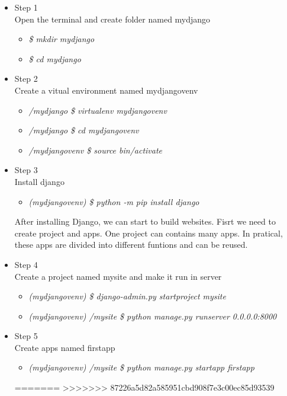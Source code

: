 \begin{itemize}
	  
		\item Step 1\\
		Open the terminal and create folder named mydjango
			\begin{itemize}
				\item\emph {\$ mkdir mydjango}\\
				\item\emph {\$ cd mydjango}
			\end{itemize}	
		\item Step 2\\
		Create a vitual environment named mydjangovenv
			\begin{itemize}
				\item\emph {/mydjango \$ virtualenv mydjangovenv}\\
				\item\emph {/mydjango \$ cd mydjangovenv}\\
				\item\emph {/mydjangovenv \$ source bin/activate}
			\end{itemize}	
		\item Step 3\\
		Install django
			\begin{itemize}
				\item\emph {(mydjangovenv) \$ python -m pip install django}\\
			\end{itemize}	

After installing Django, we can start to build websites. Fisrt we need to create project and apps. One project can contains many apps. In pratical, these apps are divided into different funtions and can be reused. 
		\item Step 4\\
		Create a project named mysite and make it run in server
			\begin{itemize}
				\item\emph {(mydjangovenv) \$ django-admin.py startproject mysite}\\
				\item\emph {(mydjangovenv) /mysite \$ python manage.py runserver 0.0.0.0:8000}
			\end{itemize}	
		\item Step 5\\
		Create apps named firstapp
			\begin{itemize}
				\item\emph {(mydjangovenv) /mysite \$ python manage.py startapp firstapp}\\
			\end{itemize}
=======
>>>>>>> 87226a5d82a585951cbd908f7e3c00ec85d93539


\end{itemize}
